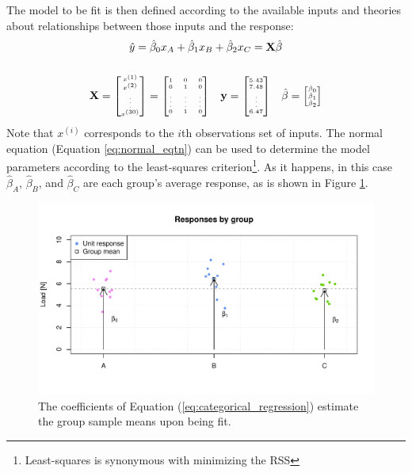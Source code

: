 \documentclass[11pt,a4paper,article]{memoir} %
\begin{document}
The model to be fit is then defined according to the available inputs and theories about relationships between those inputs and the response:
\begin{gather}
	\hat{y} = \hat{\beta}_0 x_A + \hat{\beta}_{1}x_B + \hat{\beta}_{2}x_C = \mathbf{X} \hat{\beta} \label{eq:categorical_regression} \\[5mm]
	\mathbf{X} = 
		{\tiny
			\begin{bmatrix}
				x^{(1)} \\ x^{(2)} \\ \vdots \\ x^{(30)}
			\end{bmatrix}
			=
			\begin{bmatrix}
				 1 & 0 & 0 \\  0 & 1 & 0 \\ \vdots & \vdots & \vdots \\ 0 & 1 & 0
			\end{bmatrix}}
	\quad \mathbf{y} = {\tiny \begin{bmatrix} 5.43 \\ 7.48 \\ \vdots \\ 6.47 \end{bmatrix}}
	\quad \hat{\beta} = {\tiny \begin{bmatrix} \hat{\beta}_0 \\ \hat{\beta}_1 \\ \hat{\beta}_2 \end{bmatrix}}
\end{gather}
Note that $x^{(i)}$ corresponds to the $i$th observations set of inputs. The normal equation (Equation \ref{eq:normal_eqtn}) can be used to determine the model parameters according to the least-squares criterion\footnote{Least-squares is synonymous with minimizing the RSS}. As it happens, in this case $\hat{\beta}_A$, $\hat{\beta}_B$, and $\hat{\beta}_C$ are each group's average response, as is shown in Figure \ref{fig:categorical_regression}.
\begin{figure}[h]
\includegraphics[width=\textwidth]{categorical_regression.pdf}
\caption{The coefficients of Equation  (\ref{eq:categorical_regression}) estimate the group sample means upon being fit.}
\label{fig:categorical_regression}
\end{figure}
\end{document}

